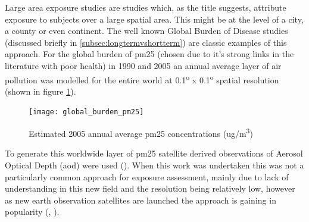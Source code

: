 Large area exposure studies are studies which, as the title suggests, attribute exposure to subjects over a large spatial area. This might be at the level of a city, a county or even continent. The well known Global Burden of Disease studies (discussed briefly in \ref{subsec:longtermvshortterm}) are classic examples of this approach. For the global burden of \gls{pm25} (chosen due to it's strong links in the literature with poor health) in 1990 and 2005 an annual average layer of air pollution was modelled for the entire world at 0.1\textsuperscript{o} x 0.1\textsuperscript{o} spatial resolution (shown in figure \ref{fig:globalburdenpm25}).

\begin{figure}[H]
\centering
\texttt{[image: global\_burden\_pm25]}
\caption{Estimated 2005 annual average \gls{pm25} concentrations (ug/m\textsuperscript{3})}
\label{fig:globalburdenpm25}
\end{figure}

To generate this worldwide layer of \gls{pm25} satellite derived observations of Aerosol Optical Depth (\gls{aod}) were used (\cite{Brauer2012}). When this work was undertaken this was not a particularly common approach for exposure assessment, mainly due to lack of understanding in this new field and the resolution being relatively low, however as new earth observation satellites are launched the approach is gaining in popularity (\cite{VanDonkelaar2015}, \cite{Hoek2017}).

